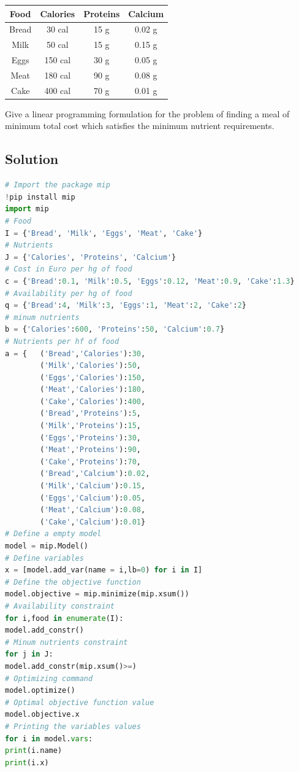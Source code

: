 \documentclass[12pt, a4paper]{report}
\newtheorem[style=M,bodystyle=\normalfont]{theorem}{Theorem}
\newtheorem[style=M,bodystyle=\normalfont]{corollary}{Corollary}
\newtheorem[style=M,bodystyle=\normalfont]{lemma}{Lemma}
\newtheorem[style=M,bodystyle=\normalfont]{definition}{Definition}
\begin{document}
        \begin{table}[H]
            \centering
            \begin{tabular}{|cccc|}
            \hline
            \textbf{Food}               & \textbf{Calories}            & \textbf{Proteins}         & \textbf{Calcium} \\ \hline
            \multicolumn{1}{|c|}{Bread} & \multicolumn{1}{c|}{30 cal}  & \multicolumn{1}{c|}{15 g} & 0.02 g           \\
            \multicolumn{1}{|c|}{Milk}  & \multicolumn{1}{c|}{50 cal}  & \multicolumn{1}{c|}{15 g} & 0.15 g           \\
            \multicolumn{1}{|c|}{Eggs}  & \multicolumn{1}{c|}{150 cal} & \multicolumn{1}{c|}{30 g} & 0.05 g           \\
            \multicolumn{1}{|c|}{Meat}  & \multicolumn{1}{c|}{180 cal} & \multicolumn{1}{c|}{90 g} & 0.08 g           \\
            \multicolumn{1}{|c|}{Cake}  & \multicolumn{1}{c|}{400 cal} & \multicolumn{1}{c|}{70 g} & 0.01 g           \\ \hline
            \end{tabular}
        \end{table}
        Give a linear programming formulation for the problem of finding a meal of minimum total cost which satisfies the minimum nutrient requirements.
    \subsection*{Solution}
        \begin{lstlisting}[language=Python]
# Import the package mip
!pip install mip
import mip
# Food
I = {'Bread', 'Milk', 'Eggs', 'Meat', 'Cake'}
# Nutrients
J = {'Calories', 'Proteins', 'Calcium'}
# Cost in Euro per hg of food
c = {'Bread':0.1, 'Milk':0.5, 'Eggs':0.12, 'Meat':0.9, 'Cake':1.3}
# Availability per hg of food
q = {'Bread':4, 'Milk':3, 'Eggs':1, 'Meat':2, 'Cake':2}
# minum nutrients 
b = {'Calories':600, 'Proteins':50, 'Calcium':0.7}
# Nutrients per hf of food
a = {   ('Bread','Calories'):30,
        ('Milk','Calories'):50,
        ('Eggs','Calories'):150,
        ('Meat','Calories'):180,
        ('Cake','Calories'):400,
        ('Bread','Proteins'):5,
        ('Milk','Proteins'):15,
        ('Eggs','Proteins'):30,
        ('Meat','Proteins'):90,
        ('Cake','Proteins'):70,
        ('Bread','Calcium'):0.02,
        ('Milk','Calcium'):0.15,
        ('Eggs','Calcium'):0.05,
        ('Meat','Calcium'):0.08,
        ('Cake','Calcium'):0.01}
# Define a empty model
model = mip.Model()
# Define variables
x = [model.add_var(name = i,lb=0) for i in I]
# Define the objective function
model.objective = mip.minimize(mip.xsum())
# Availability constraint
for i,food in enumerate(I):
model.add_constr()
# Minum nutrients constraint
for j in J:
model.add_constr(mip.xsum()>=)
# Optimizing command
model.optimize()
# Optimal objective function value
model.objective.x
# Printing the variables values
for i in model.vars:
print(i.name)
print(i.x)
        \end{lstlisting}
    
\end{document}
